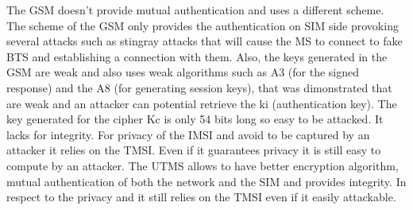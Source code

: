 \begin{solution}
    The GSM doesn't provide mutual authentication and uses a different scheme. The scheme of the GSM only provides the authentication on SIM side provoking several attacks such as stingray attacks that will cause the MS to connect to fake BTS and establishing a connection with them. Also, the keys generated in the GSM are weak and also uses weak algorithms such as A3 (for the signed response) and the A8 (for generating session keys), that was dimonstrated that are weak and an attacker can potential retrieve the ki (authentication key). The key generated for the cipher Kc is only 54 bits long so easy to be attacked. It lacks for integrity. For privacy of the IMSI and avoid to be captured by an attacker it relies on the TMSI. Even if it guarantees privacy it is still easy to compute by an attacker.
    The UTMS allows to have better encryption algorithm, mutual authentication of both the network and the SIM and provides integrity. In respect to the privacy and it still relies on the TMSI even if it easily attackable.
\end{solution}